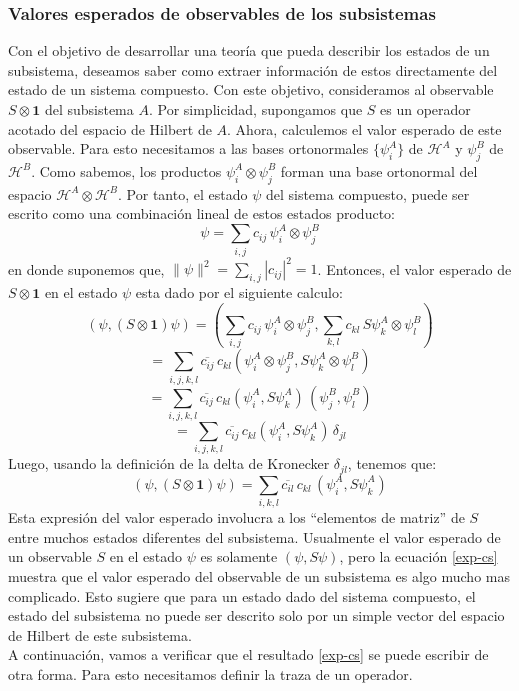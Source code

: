 \documentclass[12pt]{book}
\numberwithin{equation}{chapter}
\def\ol{\overline}
\def\H{\mathcal{H}}
\def\pr{\otimes}
\def\1{\mathbf{1}}
\begin{document}
\subsubsection{Valores esperados de observables de los subsistemas}
Con el objetivo de desarrollar una teor\'ia que pueda describir los estados de un subsistema, deseamos saber como extraer informaci\'on de estos directamente del estado de un sistema compuesto. Con este objetivo, consideramos al observable $S \pr \1$ del subsistema $A$. Por simplicidad, supongamos que $S$ es un operador acotado del espacio de Hilbert de $A$. Ahora, calculemos el valor esperado de este observable. Para esto necesitamos a las bases ortonormales $\{ \psi_{i}^{A} \}$ de $\H^{A}$ y $\psi_{j}^{B}$ de $\H^{B}$. Como sabemos, los productos $ \psi_{i}^{A} \pr \psi_{j}^{B} $ forman una base ortonormal del espacio $\H^{A} \pr \H^{B}$. Por tanto, el estado $\psi$ del sistema compuesto, puede ser escrito como una combinaci\'on lineal de estos estados producto: 
$$ \psi = \sum_{i,j} c_{ij}\, \psi_{i}^{A} \pr \psi_{j}^{B} $$
en donde suponemos que, $\| \psi \|^{2}= \sum_{i,j} |c_{ij}|^{2} =1 $. Entonces, el valor esperado de $S \pr \1$ en el estado $\psi$ esta dado por el siguiente calculo:
$$ ( \psi, (S \pr \1)\psi )= \left( \sum_{i,j} c_{ij}\, \psi_{i}^{A} \pr \psi_{j}^{B} , \sum_{k,l} c_{kl}\, S\psi_{k}^{A} \pr \psi_{l}^{B}  \right) $$
$$= \sum_{i,j,k,l} \ol{c_{ij}}\, c_{kl} ( \psi_{i}^{A}\pr \psi_{j}^{B}, S\psi_{k}^{A}\pr \psi_{l}^{B} ) $$
$$=  \sum_{i,j,k,l} \ol{c_{ij}}\, c_{kl} (\psi_{i}^{A},S\psi_{k}^{A}) \, (\psi_{j}^{B},\psi_{l}^{B} ) $$
$$  = \sum_{i,j,k,l} \ol{c_{ij}}\, c_{kl} (\psi_{i}^{A},S\psi_{k}^{A}) \, \delta_{jl}  $$
Luego, usando la definici\'on de la delta de Kronecker $\delta_{jl}$, tenemos que:
\begin{equation}\label{exp-cs}
( \psi, (S \pr \1)\psi )= \sum_{i,k,l} \ol{c_{il}}\, c_{kl}\, (\psi_{i}^{A},S\psi_{k}^{A})
\end{equation}
Esta expresi\'on del valor esperado involucra a los ``elementos de matriz'' de $S$ entre muchos estados diferentes del subsistema. Usualmente el valor esperado de un observable $S$ en el estado $\psi$ es solamente $( \psi , S \psi )$, pero la ecuaci\'on \eqref{exp-cs} muestra que el valor esperado del observable de un subsistema es algo mucho mas complicado. Esto sugiere que para un estado dado del sistema compuesto, el estado del subsistema no puede ser descrito solo por un simple vector del espacio de Hilbert de este subsistema. \\
A continuaci\'on, vamos a verificar que el resultado \eqref{exp-cs} se puede escribir de otra forma. Para esto necesitamos definir la traza de un operador.
\end{document}
